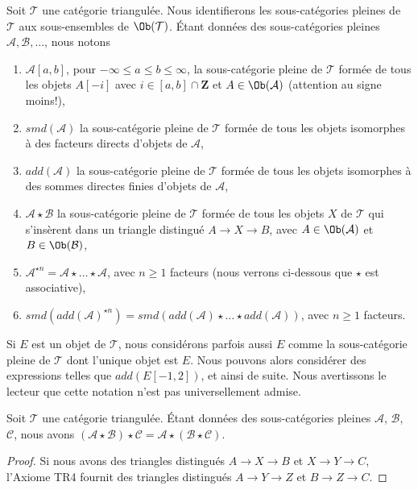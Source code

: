 \noindent
Soit $\mathcal{T}$ une catégorie triangulée. Nous identifierons les
sous-catégories pleines de $\mathcal{T}$ aux sous-ensembles de
$\Ob(\mathcal{T})$. Étant données des sous-catégories pleines
$\mathcal{A}, \mathcal{B}, \ldots$, nous notons
\begin{enumerate}
\item $\mathcal{A}[a, b]$, pour $-\infty \leq a \leq b \leq \infty$, la
sous-catégorie pleine de $\mathcal{T}$ formée de tous les objets $A[-i]$ avec
$i \in [a, b] \cap \mathbf{Z}$ et $A \in \Ob(\mathcal{A})$ (attention au
signe moins!),
\item $smd(\mathcal{A})$ la sous-catégorie pleine de $\mathcal{T}$ formée de
tous les objets isomorphes à des facteurs directs d'objets de $\mathcal{A}$,
\item $add(\mathcal{A})$ la sous-catégorie pleine de $\mathcal{T}$ formée de
tous les objets isomorphes à des sommes directes finies d'objets de
$\mathcal{A}$,
\item $\mathcal{A} \star \mathcal{B}$ la sous-catégorie pleine de
$\mathcal{T}$ formée de tous les objets $X$ de $\mathcal{T}$ qui s'insèrent
dans un triangle distingué $A \to X \to B$, avec
$A \in \Ob(\mathcal{A})$ et $B \in \Ob(\mathcal{B})$,
\item $\mathcal{A}^{\star n} = \mathcal{A} \star \ldots \star \mathcal{A}$,
avec $n \geq 1$ facteurs (nous verrons ci-dessous que $\star$ est
associative),
\item $smd(add(\mathcal{A})^{\star n}) =
smd(add(\mathcal{A}) \star \ldots \star add(\mathcal{A}))$, avec
$n \geq 1$ facteurs.
\end{enumerate}
Si $E$ est un objet de $\mathcal{T}$, nous considérons parfois aussi $E$ comme
la sous-catégorie pleine de $\mathcal{T}$ dont l'unique objet est $E$.
Nous pouvons alors considérer des expressions telles que $add(E[-1, 2])$, et
ainsi de suite. Nous avertissons le lecteur que cette notation n'est pas
universellement admise.

\begin{lemma}
\label{lemma-associativity-star}
Soit $\mathcal{T}$ une catégorie triangulée.
Étant données des sous-catégories pleines $\mathcal{A}$, $\mathcal{B}$,
$\mathcal{C}$, nous avons
$(\mathcal{A} \star \mathcal{B}) \star \mathcal{C} =
\mathcal{A} \star (\mathcal{B} \star \mathcal{C})$.
\end{lemma}

\begin{proof}
Si nous avons des triangles distingués $A \to X \to B$ et
$X \to Y \to C$, l'Axiome TR4 fournit des triangles distingués
$A \to Y \to Z$ et $B \to Z \to C$.
\end{proof}

